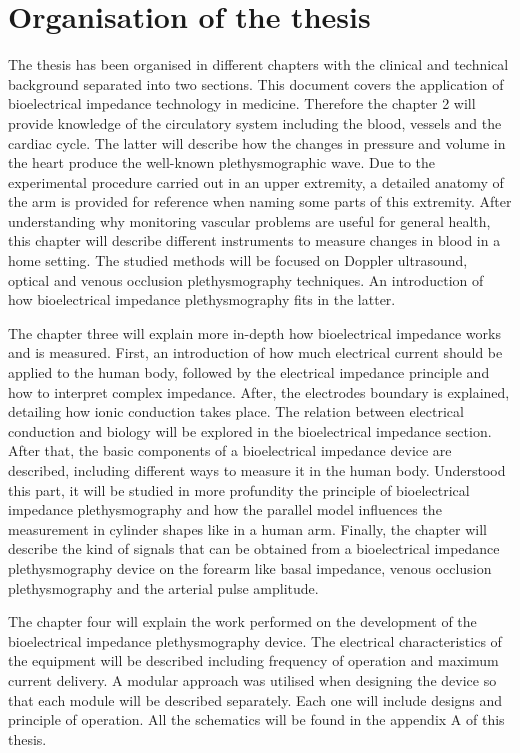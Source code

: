 \section{Organisation of the thesis}
The thesis has been organised in different chapters with the clinical and technical background separated into two sections. This document covers the application of bioelectrical impedance technology in medicine. Therefore the chapter 2 will provide knowledge of the circulatory system including the blood, vessels and the cardiac cycle. The latter will describe how the changes in pressure and volume in the heart produce the well-known plethysmographic wave. Due to the experimental procedure carried out in an upper extremity, a detailed anatomy of the arm is provided for reference when naming some parts of this extremity. After understanding why monitoring vascular problems are useful for general health, this chapter will describe different instruments to measure changes in blood in a home setting. The studied methods will be focused on Doppler ultrasound, optical and venous occlusion plethysmography techniques. An introduction of how bioelectrical impedance plethysmography fits in the latter.

The chapter three will explain more in-depth how bioelectrical impedance works and is measured. First, an introduction of how much electrical current should be applied to the human body, followed by the electrical impedance principle and how to interpret complex impedance. After, the electrodes boundary is explained, detailing how ionic conduction takes place. The relation between electrical conduction and biology will be explored in the bioelectrical impedance section.  After that, the basic components of a bioelectrical impedance device are described, including different ways to measure it in the human body. Understood this part, it will be studied in more profundity the principle of bioelectrical impedance plethysmography and how the parallel model influences the measurement in cylinder shapes like in a human arm. Finally, the chapter will describe the kind of signals that can be obtained from a bioelectrical impedance plethysmography device on the forearm like basal impedance, venous occlusion plethysmography and the arterial pulse amplitude.

The chapter four will explain the work performed on the development of the bioelectrical impedance plethysmography device. The electrical characteristics of the equipment will be described including frequency of operation and maximum current delivery. A modular approach was utilised when designing the device so that each module will be described separately.  Each one will include designs and principle of operation. All the schematics will be found in the appendix A of this thesis. 

